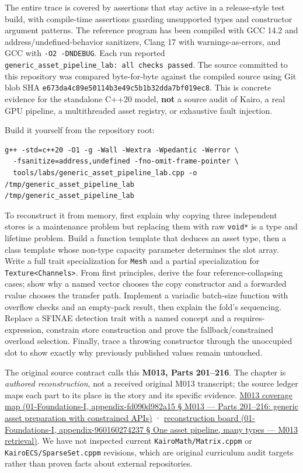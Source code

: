 The entire trace is covered by assertions that stay active in a release-style test build, with compile-time assertions guarding unsupported types and constructor argument patterns. The reference program has been compiled with GCC 14.2 and address/undefined-behavior sanitizers, Clang 17 with warnings-as-errors, and GCC with \texttt{-O2\ -DNDEBUG}. Each run reported \texttt{generic\_asset\_pipeline\_lab:\ all\ checks\ passed}. The source committed to this repository was compared byte-for-byte against the compiled source using Git blob SHA \texttt{e673da4c89e50114b3e49c5b1b32dda7bf019ec8}. This is concrete evidence for the standalone C++20 model, \textbf{not} a source audit of Kairo, a real GPU pipeline, a multithreaded asset registry, or exhaustive fault injection.

Build it yourself from the repository root:

\begin{verbatim}
g++ -std=c++20 -O1 -g -Wall -Wextra -Wpedantic -Werror \
  -fsanitize=address,undefined -fno-omit-frame-pointer \
  tools/labs/generic_asset_pipeline_lab.cpp -o /tmp/generic_asset_pipeline_lab
/tmp/generic_asset_pipeline_lab
\end{verbatim}

To reconstruct it from memory, first explain why copying three independent stores is a maintenance problem but replacing them with raw \texttt{void*} is a type and lifetime problem. Build a function template that deduces an asset type, then a class template whose non-type capacity parameter determines the slot array. Write a full trait specialization for \texttt{Mesh} and a partial specialization for \texttt{Texture\textless{}Channels\textgreater{}}. From first principles, derive the four reference-collapsing cases; show why a named vector chooses the copy constructor and a forwarded rvalue chooses the transfer path. Implement a variadic batch-size function with overflow checks and an empty-pack result, then explain the fold's sequencing. Replace a SFINAE detection trait with a named concept and a requires-expression, constrain store construction and prove the fallback/constrained overload selection. Finally, trace a throwing constructor through the unoccupied slot to show exactly why previously published values remain untouched.

The original source contract calls this \textbf{M013, Parts 201--216}. The chapter is \emph{authored reconstruction}, not a received original M013 transcript; the source ledger maps each part to its place in the story and its specific evidence. \href{}{M013 coverage map (01-Foundations-I, appendix-fd090d982a15 § M013 --- Parts 201--216: generic asset preparation with constrained APIs)} · \href{}{reconstruction board (01-Foundations-I, appendix-960160274237 § One asset pipeline, many types --- M013 retrieval)}. We have not inspected current \texttt{KairoMath/Matrix.cppm} or \texttt{KairoECS/SparseSet.cppm} revisions, which are original curriculum audit targets rather than proven facts about external repositories.

